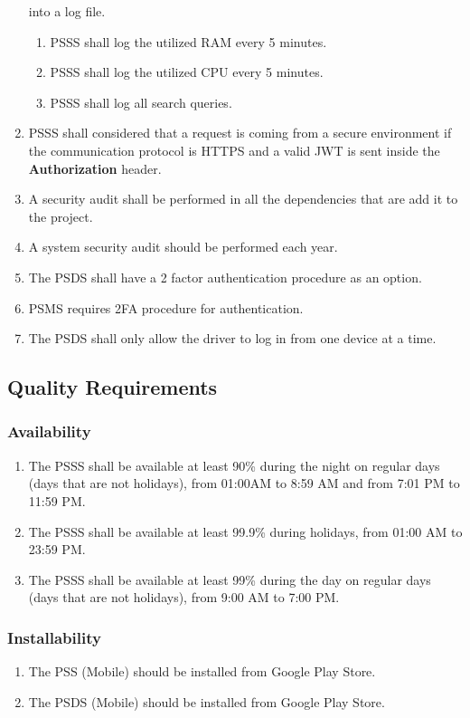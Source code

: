\begin{enumerate}[label=SEC-\arabic*]
    into a log file.
    \begin{enumerate}[label=SEC-11.\arabic*]
        \item PSSS shall log the utilized RAM every 5 minutes. 
        \item PSSS shall log the utilized CPU every 5 minutes.
        \item PSSS shall log all search queries.
    \end{enumerate}
    \item PSSS shall considered that a request is coming from a secure 
    environment if the communication protocol is HTTPS and a 
    valid JWT \cite{jwt} is sent inside the \textbf{Authorization} header.
    \item A security audit shall be performed in all the dependencies that 
    are add it to the project.
    \item A system security audit should be performed each year.
    \item The PSDS shall have a 2 factor authentication procedure as an option.
    \item PSMS requires 2FA procedure for authentication.
    \item The PSDS shall only allow the driver to log in from one 
    device at a time.
\end{enumerate}
\pagebreak
\subsection{Quality Requirements}
\subsubsection{Availability}
\begin{enumerate}[label=AVL-\arabic*]
    \item The PSSS shall be available at least 90\% during 
    the night on regular days (days that are not holidays), from 
    01:00AM to 8:59 AM and from 7:01 PM to 11:59 PM.
    \item The PSSS shall be available at least 99.9\% during holidays, 
    from 01:00 AM to 23:59 PM.
    \item The PSSS shall be available at least 99\% during the day on regular 
    days (days that are not holidays), from 9:00 AM to 7:00 PM.
\end{enumerate}

\subsubsection{Installability}
\begin{enumerate}[label=INS-\arabic*]
    \item The PSS (Mobile) should be installed from Google Play Store.
    \item The PSDS (Mobile) should be installed from Google Play Store.
\end{enumerate}

